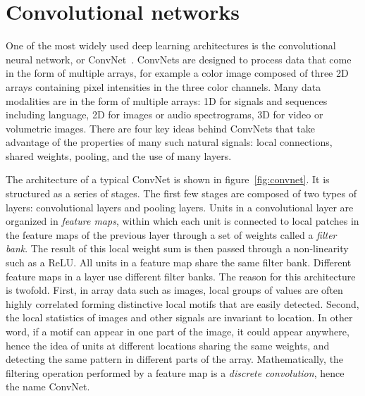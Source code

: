 \documentclass[10pts]{article}
\begin{document}
\section{Convolutional networks}

One of the most widely used deep learning architectures is the
convolutional neural network, or
ConvNet~\cite{lecun-90c,lecun-98}. ConvNets are designed to process
data that come in the form of multiple arrays, for example a color
image composed of three 2D arrays containing pixel intensities in the
three color channels. Many data modalities are in the form of multiple
arrays: 1D for signals and sequences including language, 2D for images
or audio spectrograms, 3D for video or volumetric images.  There are
four key ideas behind ConvNets that take advantage of the properties
of many such natural signals: local connections, shared weights,
pooling, and the use of many layers.

The architecture of a typical ConvNet is shown in
figure~\ref{fig:convnet}.  It is structured as a series of stages. The
first few stages are composed of two types of layers: convolutional
layers and pooling layers. Units in a convolutional layer are
organized in {\em feature maps}, within which each unit is connected
to local patches in the feature maps of the previous layer through a
set of weights called a {\em filter bank}. The result of this local
weight sum is then passed through a non-linearity such as a ReLU.  All
units in a feature map share the same filter bank. Different feature
maps in a layer use different filter banks. The reason for this
architecture is twofold. First, in array data such as images, local
groups of values are often highly correlated forming distinctive local
motifs that are easily detected. Second, the local statistics of
images and other signals are invariant to location. In other word, if
a motif can appear in one part of the image, it could appear anywhere,
hence the idea of units at different locations sharing the same
weights, and detecting the same pattern in different parts of the
array.  Mathematically, the filtering operation performed by a feature
map is a {\em discrete convolution}, hence the name ConvNet.
\end{document}
